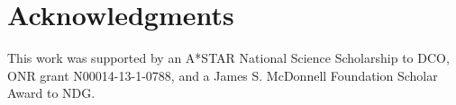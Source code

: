 \documentclass[10pt,letterpaper]{article}
\begin{document}



\section{Acknowledgments}

This work was supported by an A*STAR National Science Scholarship to DCO, ONR grant N00014-13-1-0788, and a James S. McDonnell Foundation Scholar Award to NDG.




\setlength{\bibleftmargin}{.125in}
\setlength{\bibindent}{-\bibleftmargin}



\end{document}
